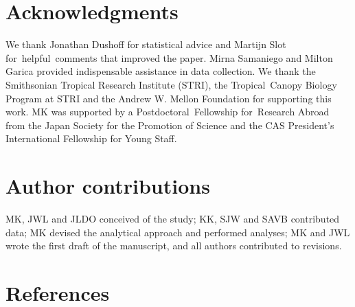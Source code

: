 \documentclass[
  12pt,
  letterpaper,
  DIV=11,
  numbers=noendperiod]{scrartcl}
\begin{document}
\hypertarget{acknowledgments}{%
\section{Acknowledgments}\label{acknowledgments}}

We thank Jonathan Dushoff for statistical advice and Martijn Slot
for~helpful~comments that improved the paper. Mirna Samaniego and Milton
Garica provided indispensable assistance in data collection. We thank
the Smithsonian Tropical Research Institute (STRI), the Tropical~Canopy
Biology Program at STRI and the Andrew W. Mellon Foundation for
supporting this work. MK was supported by a Postdoctoral~Fellowship
for~Research Abroad from the Japan Society for the Promotion of Science
and the CAS President's International Fellowship for Young Staff.

\hypertarget{author-contributions}{%
\section{Author contributions}\label{author-contributions}}

MK, JWL and JLDO conceived of the study; KK, SJW and SAVB contributed
data; MK devised the analytical approach and performed analyses; MK and
JWL wrote the first draft of the manuscript, and all authors contributed
to revisions.

\hypertarget{references}{%
\section{References}\label{references}}
\end{document}
